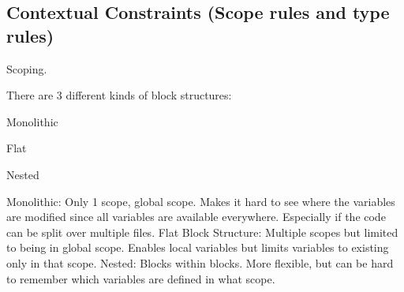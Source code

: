 \subsection{Contextual Constraints (Scope rules and type rules)}
Scoping.

There are 3 different kinds of block structures:
\begin{list}
    \item Monolithic
    \item Flat
    \item Nested
\end{list}

Monolithic: Only 1 scope, global scope. Makes it hard to see where the variables are modified since all variables are available everywhere. Especially if the code can be split over multiple files.
Flat Block Structure: Multiple scopes but limited to being in global scope. Enables local variables but limits variables to existing only in that scope.
Nested: Blocks within blocks. More flexible, but can be hard to remember which variables are defined in what scope.

